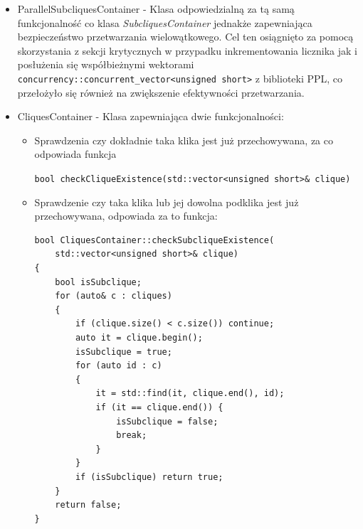 \documentclass[12pt]{article}
\newcounter{algorytm}
\def\inline{\lstinline[basicstyle=\ttfamily,keywordstyle={}]}
\begin{document}
\begin{itemize}
Weryfikację umożliwia algorytm:
\begin{minipage}{\linewidth}
\begin{lstlisting}[caption={Kod metody checkCliqueExistence klasy SubcliquesContainer}]
bool SubcliquesContainer::checkCliqueExistence(
	std::vector<unsigned short>& clique)
{
	assert(clique.size() >= 2);

	std::vector<bool> types(cliquesCounter, false);
	std::vector<bool> typesNew(cliquesCounter, false);

	for (auto type : typesMap[clique[0]])
	{
		types[type] = true;
	}

	for (auto i = 1; i < clique.size(); ++i)
	{
		for (auto id : typesMap[clique[i]])
		{
			if (types[id]) typesNew[id] = true;
		}
		types = typesNew;
		std::fill(typesNew.begin(), typesNew.end(), false);
	}

	if (std::find(types.begin(), types.end(), true) != types.end())
		return true;

	return false;
}
\end{lstlisting}
\end{minipage}
	
\item ParallelSubcliquesContainer - Klasa odpowiedzialną za tą samą funkcjonalność co klasa \textit{SubcliquesContainer} jednakże zapewniająca bezpieczeństwo przetwarzania wielowątkowego. Cel ten osiągnięto za pomocą skorzystania z sekcji krytycznych w przypadku inkrementowania licznika jak i posłużenia się współbieżnymi wektorami \inline{concurrency::concurrent_vector<unsigned short>} z biblioteki PPL, co przełożyło się również na zwiększenie efektywności przetwarzania.

\item CliquesContainer - Klasa zapewniająca dwie funkcjonalności:
\begin{itemize}
\item Sprawdzenia czy dokładnie taka klika jest już przechowywana, za co odpowiada funkcja \raggedright \inline{bool checkCliqueExistence(std::vector<unsigned short>& clique)}
\item Sprawdzenie czy taka klika lub jej dowolna podklika jest już przechowywana, odpowiada za to funkcja:
\begin{minipage}{\linewidth}
\begin{lstlisting}[caption={Kod metody checkSublicqueExistence klasy CliquesContainer }]
bool CliquesContainer::checkSubcliqueExistence(
	std::vector<unsigned short>& clique)
{
	bool isSubclique;
  	for (auto& c : cliques)
  	{
		if (clique.size() < c.size()) continue;
    	auto it = clique.begin();
    	isSubclique = true;
        for (auto id : c)
        {
        	it = std::find(it, clique.end(), id);
        	if (it == clique.end()) {
        		isSubclique = false;
        		break;
        	}
        }
   		if (isSubclique) return true;
  	}
  	return false;
}
\end{lstlisting}
\end{minipage}
\end{itemize}


\end{itemize}
\end{document}

